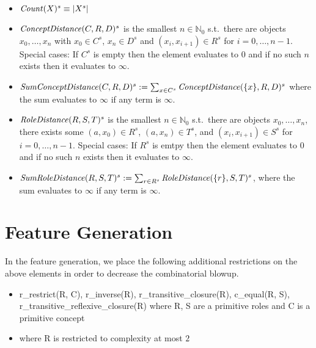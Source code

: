 \documentclass{article}
\begin{document}
\begin{itemize}
    \item $\mathit{Count}(X)^s\equiv |X^s|$
    \item $\mathit{ConceptDistance}(C, R, D)^s$ is the smallest $n\in\mathbb{N}_0$
    s.t.\ there are objects $x_0,\ldots,x_n$ with
    $x_0\in C^s$, $x_n\in D^s$ and $(x_i, x_{i+1})\in R^s$ for $i = 0,\ldots,n-1$.
    Special cases: If $C^s$ is empty then the element evaluates to $0$ and if no such $n$ exists then it evaluates to $\infty$.
    \item $\mathit{SumConceptDistance}(C, R, D)^s:=\sum_{x\in C^s}\mathit{ConceptDistance}(\{x\}, R, D)^s$
    where the sum evaluates to $\infty$ if any term is $\infty$.
    \item $\mathit{RoleDistance}(R, S, T)^s$ is the smallest $n\in\mathbb{N}_0$
    s.t.\ there are objects $x_0,\ldots,x_n$,
    there exists some $(a,x_0)\in R^s$, $(a,x_n)\in T^s$,
    and $(x_i, x_{i+1})\in S^s$ for $i = 0,\ldots,n-1$.
    Special cases: If $R^s$ is emtpy then the element evaluates to $0$ and if no such $n$ exists then it evaluates to $\infty$.
    \item $\mathit{SumRoleDistance}(R, S, T)^s:=\sum_{r\in R^s}\mathit{RoleDistance}(\{r\}, S, T)^s$,
    where the sum evaluates to $\infty$ if any term is $\infty$.
\end{itemize}

\section{Feature Generation}

In the feature generation, we place the following additional restrictions on the above elements in order to decrease the combinatorial blowup.
\begin{itemize}
    \item r\_restrict(R, C), r\_inverse(R), r\_transitive\_closure(R), c\_equal(R, S), \\
          r\_transitive\_reflexive\_closure(R) where R, S are a primitive roles and C is a primitive concept
    \item {} where R is restricted to complexity at most $2$
\end{itemize}



\end{document}
